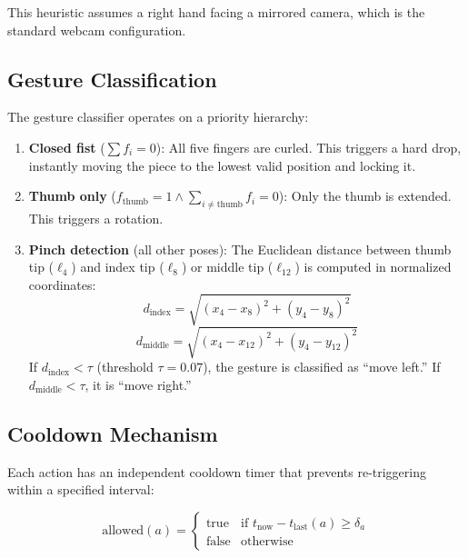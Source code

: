 \documentclass[conference]{IEEEtran}
\begin{document}
This heuristic assumes a right hand facing a mirrored camera, which is the standard webcam configuration.

\subsection{Gesture Classification}

The gesture classifier operates on a priority hierarchy:

\begin{enumerate}
    \item \textbf{Closed fist} ($\sum f_i = 0$): All five fingers are curled. This triggers a hard drop, instantly moving the piece to the lowest valid position and locking it.
    \item \textbf{Thumb only} ($f_{\text{thumb}} = 1 \land \sum_{i \neq \text{thumb}} f_i = 0$): Only the thumb is extended. This triggers a rotation.
    \item \textbf{Pinch detection} (all other poses): The Euclidean distance between thumb tip ($\ell_4$) and index tip ($\ell_8$) or middle tip ($\ell_{12}$) is computed in normalized coordinates:
    \begin{equation}
        d_{\text{index}} = \sqrt{(x_4 - x_8)^2 + (y_4 - y_8)^2}
        \label{eq:pinch_index}
    \end{equation}
    \begin{equation}
        d_{\text{middle}} = \sqrt{(x_4 - x_{12})^2 + (y_4 - y_{12})^2}
        \label{eq:pinch_middle}
    \end{equation}
    If $d_{\text{index}} < \tau$ (threshold $\tau = 0.07$), the gesture is classified as ``move left.'' If $d_{\text{middle}} < \tau$, it is ``move right.''
\end{enumerate}

\subsection{Cooldown Mechanism}

Each action has an independent cooldown timer that prevents re-triggering within a specified interval:

\begin{equation}
    \text{allowed}(a) = \begin{cases} \text{true} & \text{if } t_{\text{now}} - t_{\text{last}}(a) \geq \delta_a \\ \text{false} & \text{otherwise} \end{cases}
    \label{eq:cooldown}
\end{equation}
\end{document}
